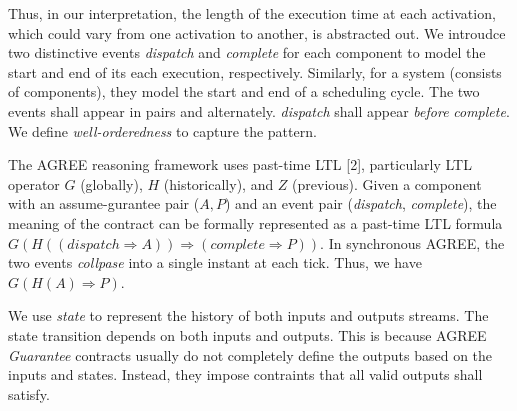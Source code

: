 Thus, in our interpretation, the length of the execution time at each activation, which could vary from one activation to another, is abstracted out. We introudce two distinctive events \emph{dispatch} and \emph{complete} for each component to model the start and end of its each execution, respectively. Similarly, for a system (consists of components), they model the start and end of a scheduling cycle.
The two events shall appear in pairs and alternately. \emph{dispatch} shall appear \emph{before} \emph{complete}. We define \emph{well-orderedness} to capture the pattern.

The AGREE reasoning framework uses past-time LTL [2], particularly LTL operator $G$ (globally), $H$ (historically), and $Z$ (previous). Given a component with an assume-gurantee pair ($A,P$) and an event pair (\emph{dispatch}, \emph{complete}), the meaning of the contract can be formally represented as a past-time LTL formula $G(H((dispatch \Rightarrow A)) \Rightarrow (complete \Rightarrow P))$. In synchronous AGREE, the two events \emph{collpase} into a single instant at each tick. Thus, we have $G(H(A) \Rightarrow P)$.

We use \emph{state} to represent the history of both inputs and outputs streams. The state transition depends on both inputs and outputs. This is because AGREE \emph{Guarantee} contracts usually do not completely define the outputs based on the inputs and states. Instead, they impose contraints that all valid outputs shall satisfy.



